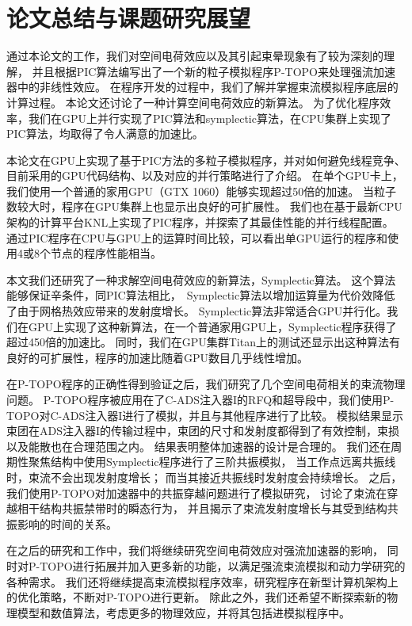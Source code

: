 
\chapter{论文总结与课题研究展望}
\label{chap:conclusion}
通过本论文的工作，我们对空间电荷效应以及其引起束晕现象有了较为深刻的理解，
并且根据PIC算法编写出了一个新的粒子模拟程序P-TOPO来处理强流加速器中的非线性效应。
在程序开发的过程中，我们了解并掌握束流模拟程序底层的计算过程。
本论文还讨论了一种计算空间电荷效应的新算法。
为了优化程序效率，我们在GPU上并行实现了PIC算法和symplectic算法，在CPU集群上实现了PIC算法，均取得了令人满意的加速比。

本论文在GPU上实现了基于PIC方法的多粒子模拟程序，并对如何避免线程竞争、目前采用的GPU代码结构、以及对应的并行策略进行了介绍。
在单个GPU卡上，我们使用一个普通的家用GPU（GTX 1060）能够实现超过50倍的加速。
当粒子数较大时，程序在GPU集群上也显示出良好的可扩展性。
我们也在基于最新CPU架构的计算平台KNL上实现了PIC程序，并探索了其最佳性能的并行线程配置。
通过PIC程序在CPU与GPU上的运算时间比较，可以看出单GPU运行的程序和使用4或8个节点的程序性能相当。

本文我们还研究了一种求解空间电荷效应的新算法，Symplectic算法。
这个算法能够保证辛条件，同PIC算法相比，~Symplectic算法以增加运算量为代价效降低了由于网格热效应带来的发射度增长。
Symplectic算法非常适合GPU并行化。我们在GPU上实现了这种新算法，在一个普通家用GPU上，Symplectic程序获得了超过450倍的加速比。
同时，我们在GPU集群Titan上的测试还显示出这种算法有良好的可扩展性，程序的加速比随着GPU数目几乎线性增加。

在P-TOPO程序的正确性得到验证之后，我们研究了几个空间电荷相关的束流物理问题。
P-TOPO程序被应用在了C-ADS注入器I的RFQ和超导段中，我们使用P-TOPO对C-ADS注入器I进行了模拟，并且与其他程序进行了比较。
模拟结果显示束团在ADS注入器I的传输过程中，束团的尺寸和发射度都得到了有效控制，束损以及能散也在合理范围之内。
结果表明整体加速器的设计是合理的。
我们还在周期性聚焦结构中使用Symplectic程序进行了三阶共振模拟，
当工作点远离共振线时，束流不会出现发射度增长；
而当其接近共振线时发射度会持续增长。
之后，我们使用P-TOPO对加速器中的共振穿越问题进行了模拟研究，
讨论了束流在穿越相干结构共振禁带时的瞬态行为，
并且揭示了束流发射度增长与其受到结构共振影响的时间的关系。

在之后的研究和工作中，我们将继续研究空间电荷效应对强流加速器的影响，
同时对P-TOPO进行拓展并加入更多新的功能，以满足强流束流模拟和动力学研究的各种需求。
我们还将继续提高束流模拟程序效率，研究程序在新型计算机架构上的优化策略，不断对P-TOPO进行更新。
除此之外，我们还希望不断探索新的物理模型和数值算法，考虑更多的物理效应，并将其包括进模拟程序中。